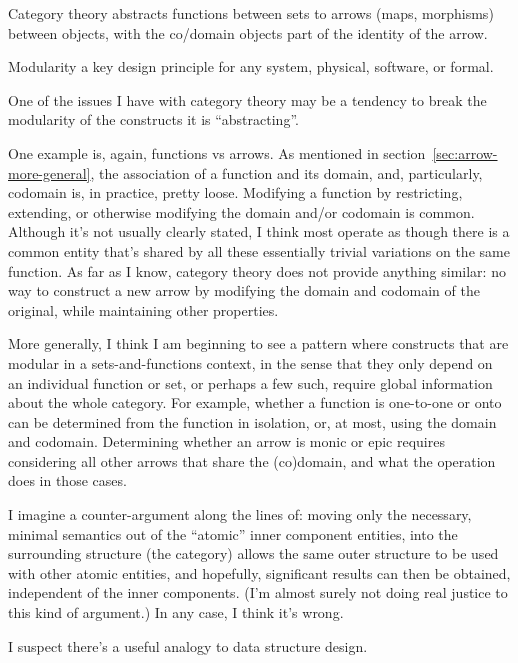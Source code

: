 \documentclass[11pt]{book}
\begin{document}
Category theory abstracts functions between sets to
arrows (maps, morphisms) between objects,
with the co/domain objects part of the identity of the arrow.

\label{sec:Modularity_breaking}

Modularity a key design principle for any system, physical, 
software, or formal.

One of the issues I have with category theory
may be a tendency to break the modularity of the constructs it is
``abstracting''.

One example is, again, functions vs arrows.
As mentioned in section~\ref{sec:arrow-more-general},
the association of a function and its domain, and, particularly,
codomain is, in practice, pretty loose.
Modifying a function by restricting, extending, or otherwise
modifying the domain and/or codomain is common.
Although it's not usually clearly stated, 
I think most operate as though there is a common entity
that's shared by all these essentially trivial variations on the
same function.
As far as I know, category theory does not provide anything similar:
no way to construct a new arrow by modifying the domain
and codomain of the original, while maintaining other properties.

More generally, I think I am beginning to see a pattern where
constructs that are modular in a sets-and-functions context,
in the sense that they only depend on an individual function or
set, or perhaps a few such, require global information about
the whole category.
For example, whether a function is one-to-one or onto
can be determined from the function in isolation,
or, at most, using the domain and codomain.
Determining whether an arrow is monic or epic requires
considering all other arrows that share the (co)domain,
and what the \compose operation does in those cases.

I imagine a counter-argument along the lines of:
moving only the necessary, minimal semantics out of the ``atomic''
inner component entities, 
into the surrounding structure (the category) allows the same 
outer structure to be used
with other atomic entities, and hopefully, significant results
can then be obtained, independent of the inner components.
(I'm almost surely not doing real justice to this kind of argument.)
In any case, I think it's wrong.

I suspect there's a useful analogy to data structure design.
\end{document}
